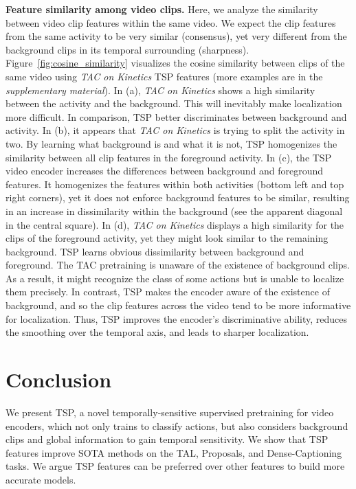 \documentclass[10pt,twocolumn,letterpaper]{article}
\begin{document}
\vspace{3pt}\noindent\textbf{Feature similarity among video clips.}
Here, we analyze the similarity between video clip features within the same video. We expect the clip features from the same activity to be very similar (consensus), yet very different from the background clips in its temporal surrounding (sharpness).
Figure~\ref{fig:cosine_similarity} visualizes the cosine similarity between clips of the same video using \textit{TAC on Kinetics} \vs TSP features (more examples are in the \emph{supplementary material}). In (a), \textit{TAC on Kinetics} shows a high similarity between the activity and the background. This will inevitably make localization more difficult. In comparison, TSP better discriminates between background and activity. In (b), it appears that \textit{TAC on Kinetics} is trying to split the activity in two. By learning what background is and what it is not, TSP homogenizes the similarity between all clip features in the foreground activity. In (c), the TSP video encoder increases the differences between background and foreground features. It homogenizes the features within both activities (bottom left and top right corners), yet it does not enforce background features to be similar, resulting in an increase in dissimilarity within the background (see the apparent diagonal in the central square).  In (d), \textit{TAC on Kinetics} displays a high similarity for the clips of the foreground activity, yet they might look similar to the remaining background. TSP learns obvious dissimilarity between background and foreground. 
The TAC pretraining is unaware of the existence of background clips. As a result, it might recognize the class of some actions but is unable to localize them precisely. In contrast, TSP makes the encoder aware of the existence of background, and so the clip features across the video tend to be more informative for localization. Thus, TSP improves the encoder's discriminative ability, reduces the smoothing over the temporal axis, and leads to sharper localization.
 \section{Conclusion}\label{sec:conclusion}

We present TSP, a novel temporally-sensitive supervised pretraining for video encoders, which not only trains to classify actions, but also considers background clips and global information to gain temporal sensitivity. We show that TSP features improve SOTA methods on the TAL, Proposals, and Dense-Captioning tasks. We argue TSP features can be preferred over other features to build more accurate models.
\end{document}
